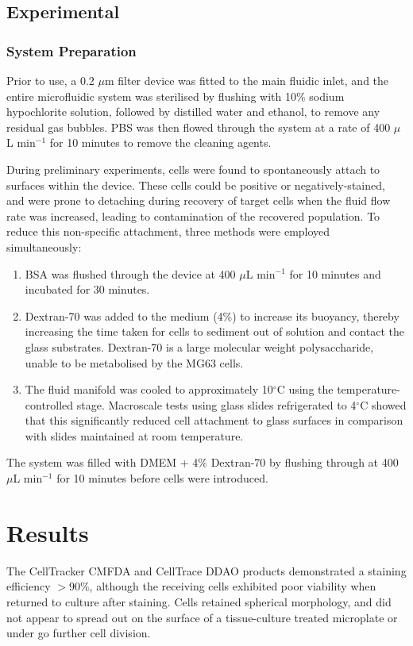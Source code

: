 \subsection{Experimental}
\label{Section:ExperimentalWork}
\subsubsection{System Preparation}
Prior to use, a 0.2 $\mu$m filter device was fitted to the main fluidic inlet, and the entire microfluidic system was sterilised by flushing with 10$\%$ sodium hypochlorite solution, followed by distilled water and ethanol, to remove any residual gas bubbles. PBS was then flowed through the system at a rate of 400 $\mu$L min$^{-1}$ for 10 minutes to remove the cleaning agents.

During preliminary experiments, cells were found to spontaneously attach to surfaces within the device. These cells could be positive or negatively-stained, and were prone to detaching during recovery of target cells when the fluid flow rate was increased, leading to contamination of the recovered population. To reduce this non-specific attachment, three methods were employed simultaneously:
\begin{enumerate}
	\item BSA was flushed through the device at 400 $\mu$L min$^{-1}$ for 10 minutes and incubated for 30 minutes.
	\item Dextran-70 was added to the medium (4\%) to increase its buoyancy, thereby increasing the time taken for cells to sediment out of solution and contact the glass substrates. Dextran-70 is a large molecular weight polysaccharide, unable to be metabolised by the MG63 cells.
	\item The fluid manifold was cooled to approximately 10$^\circ$C using the temperature-controlled stage. Macroscale tests using glass slides refrigerated to 4$^\circ$C showed that this significantly reduced cell attachment to glass surfaces in comparison with slides maintained at room temperature.
\end{enumerate}

The system was filled with DMEM + 4\% Dextran-70 by flushing through at 400 $\mu$L min$^{-1}$ for 10 minutes before cells were introduced.

\section{Results}

The CellTracker CMFDA and CellTrace DDAO products demonstrated a staining efficiency $>90\%$, although the receiving cells exhibited poor viability when returned to culture after staining. Cells retained spherical morphology, and did not appear to spread out on the surface of a tissue-culture treated microplate or under go further cell division.


